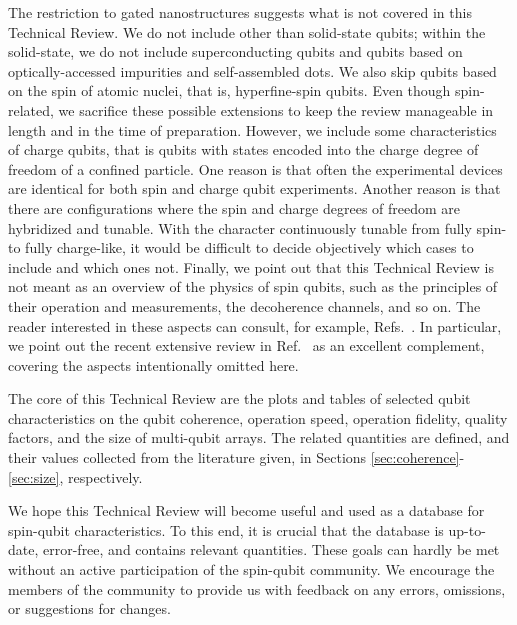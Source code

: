 \documentclass[aps, prx, showpacs, twocolumn, superscriptaddress, notitlepage, longbibliography, floatfix, nofootinbib]{revtex4-2}
\begin{document}
The restriction to gated nanostructures suggests what is not covered in this Technical Review. We do not include other than solid-state qubits; within the solid-state, we do not include superconducting qubits and qubits based on optically-accessed impurities and self-assembled dots. We also skip qubits based on the spin of atomic nuclei, that is, hyperfine-spin qubits. Even though spin-related, we sacrifice these possible extensions to keep the review manageable in length and in the time of preparation. However, we include some characteristics of charge qubits, that is qubits with states encoded into the charge degree of freedom of a confined particle. One reason is that often the experimental devices are identical for both spin and charge qubit experiments. Another reason is that there are configurations where the spin and charge degrees of freedom are hybridized and tunable. With the character continuously tunable from fully spin- to fully charge-like, it would be difficult to decide objectively which cases to include and which ones not. Finally, we point out that this Technical Review is not meant as an overview of the physics of spin qubits, such as the principles of their operation and measurements, the decoherence channels, and so on. The reader interested in these aspects can consult, for example, Refs.~\cite{oosterkamp_photon_1999, van_der_wiel_electron_2002, schliemann_electron_2003, hanson_spins_2007, kloeffel_prospects_2013, schreiber_quantum_2014, tahan_opinion_2021, chatterjee_semiconductor_2021, gonzalez-zalba_scaling_2021, scappucci_germanium_2021, oiwa_conversion_2017, vandersypen_quantum_2019, kuemmeth_roadmap_2020, chatterjee_semiconductor_2021}. In particular, we point out the recent extensive review in Ref.~\cite{burkard_semiconductor_2023} as an excellent complement, covering the aspects intentionally omitted here.


The core of this Technical Review are the plots and tables of selected qubit characteristics on the qubit coherence, operation speed, operation fidelity, quality factors, and the size of multi-qubit arrays. The related quantities are defined, and their values collected from the literature given, in Sections \ref{sec:coherence}-\ref{sec:size}, respectively.


We hope this Technical Review will become useful and used as a database for spin-qubit characteristics. To this end, it is crucial that the database is up-to-date, error-free, and contains relevant quantities. These goals can hardly be met without an active participation of the spin-qubit community. We encourage the members of the community to provide us with feedback on any errors, omissions, or suggestions for changes.
\end{document}
